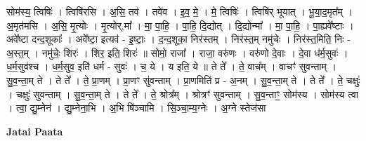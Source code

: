 \documentclass[17pt]{extarticle}
\begin{document}
सोम॑स्य॒ त्विषिः॑ । त्विषि॑रसि । अ॒सि॒ तव॑ । तवे॑व । इ॒व॒ मे॒ । मे॒ त्विषिः॑ । त्विषि॑र् भूयात् । भू॒या॒द॒मृत᳚म् । अ॒मृत॑मसि । अ॒सि॒ मृ॒त्योः । मृ॒त्योर्,मा᳚ । मा॒ पा॒हि॒ । पा॒हि॒ दि॒द्योत् । दि॒द्योन्मा᳚ । मा॒ पा॒हि॒ । पा॒ह्यवे᳚ष्टाः । अवे᳚ष्टा दन्द॒शूकाः᳚ । अवे᳚ष्टा॒ इत्यव॑ - इ॒ष्टाः॒ । द॒न्द॒शूका॒ निर॑स्तम् । निर॑स्त॒म् नमु॑चेः । निर॑स्त॒मिति॒ निः - अ॒स्त॒म् । नमु॑चेः॒ शिरः॑ । शिर॒ इति॒ शिरः॑ ॥ सोमो॒ राजा᳚ । राजा॒ वरु॑णः । वरु॑णो दे॒वाः । दे॒वा ध॑र्म॒सुवः॑ । ध॒र्म॒सुव॑श्च । ध॒र्म॒सुव॒ इति॑ धर्म - सुवः॑ । च॒ ये । य इति॒ ये ॥ ते ते᳚ । ते॒ वाच᳚म् । वाचꣳ॑ सुवन्ताम् । सु॒व॒न्ता॒म् ते । ते ते᳚ । ते॒ प्रा॒णम् । प्रा॒णꣳ सु॑वन्ताम् । प्रा॒णमिति॑ प्र - अ॒नम् । सु॒व॒न्ता॒म् ते । ते ते᳚ । ते॒ चक्षुः॑ । चक्षुः॑ सुवन्ताम् । सु॒व॒न्ता॒म् ते । ते ते᳚ । ते॒ श्रोत्र᳚म् । श्रोत्रꣳ॑ सुवन्ताम् । सु॒व॒न्ताꣳ॒॒ सोम॑स्य । सोम॑स्य त्वा । त्वा॒ द्यु॒म्नेन॑ । द्यु॒म्नेना॒भि । अ॒भि षि॑ञ्चामि । सि॒ञ्चा॒म्य॒ग्नेः । अ॒ग्ने स्तेज॑सा \newline

\textbf{Jatai Paata} \newline
\end{document}
